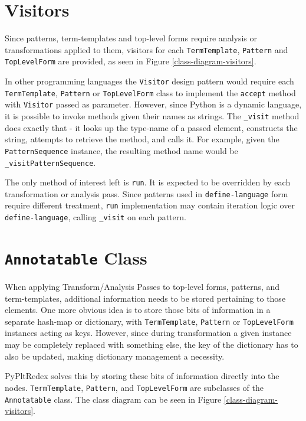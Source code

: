 \section{Visitors}
\label{section:visitors}
Since patterns, term-templates and top-level forms require analysis or transformations applied to them, visitors for each \texttt{TermTemplate}, \texttt{Pattern} and \texttt{TopLevelForm} are provided, as seen in Figure \ref{class-diagram-visitors}.

In other programming languages the \texttt{Visitor} design pattern would require each \texttt{TermTemplate}, \texttt{Pattern} or \texttt{TopLevelForm} class to implement the \texttt{accept} method with \texttt{Visitor} passed as parameter. However, since Python is a dynamic language, it is possible to invoke methods given their names as strings. The \texttt{\_visit} method does exactly that - it looks up the type-name of a passed element, constructs the string, attempts to retrieve the method, and calls it. For example, given the \texttt{PatternSequence} instance, the resulting method name would be \texttt{\_visitPatternSequence}.

The only method of interest left is \texttt{run}. It is expected to be overridden by each transformation or analysis pass.  Since patterns used in \texttt{define-language} form require different treatment, \texttt{run} implementation may contain iteration logic over \texttt{define-language}, calling \texttt{\_visit} on each pattern.

\section{\texttt{Annotatable} Class}

When applying Transform/Analysis Passes to top-level forms, patterns, and term-templates, additional information needs to be stored pertaining to those elements. One more obvious idea is to store those bits of information in a separate hash-map or dictionary, with \texttt{TermTemplate}, \texttt{Pattern} or \texttt{TopLevelForm} instances acting as keys. However, since during transformation a given instance may be completely replaced with something else, the key of the dictionary has to also be updated, making dictionary management a necessity.

PyPltRedex solves this by storing these bits of information directly into the nodes. \texttt{TermTemplate}, \texttt{Pattern}, and \texttt{TopLevelForm} are subclasses of the \texttt{Annotatable} class. The class diagram can be seen in Figure \ref{class-diagram-visitors}.

